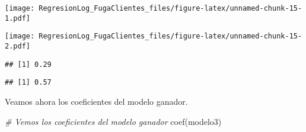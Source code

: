 \documentclass[
]{article}
\newenvironment{Shaded}{\begin{snugshade}}{\end{snugshade}}
\newcommand{\CommentTok}[1]{\textcolor[rgb]{0.56,0.35,0.01}{\textit{#1}}}
\newcommand{\DecValTok}[1]{\textcolor[rgb]{0.00,0.00,0.81}{#1}}
\newcommand{\FunctionTok}[1]{\textcolor[rgb]{0.00,0.00,0.00}{#1}}
\newcommand{\NormalTok}[1]{#1}
\newcommand{\OtherTok}[1]{\textcolor[rgb]{0.56,0.35,0.01}{#1}}
\newcommand{\SpecialCharTok}[1]{\textcolor[rgb]{0.00,0.00,0.00}{#1}}
\begin{document}
\begin{Shaded}
\end{Shaded}

\texttt{[image: RegresionLog\_FugaClientes\_files/figure-latex/unnamed-chunk-15-1.pdf]}

\begin{Shaded}
\end{Shaded}

\texttt{[image: RegresionLog\_FugaClientes\_files/figure-latex/unnamed-chunk-15-2.pdf]}

\begin{Shaded}
\end{Shaded}

\begin{verbatim}
## [1] 0.29
\end{verbatim}

\begin{Shaded}
\end{Shaded}

\begin{verbatim}
## [1] 0.57
\end{verbatim}

Veamos ahora los coeficientes del modelo ganador.

\begin{Shaded}
\begin{Highlighting}[]
\CommentTok{\# Vemos los coeficientes del modelo ganador}
\FunctionTok{coef}\NormalTok{(modelo3)}
\end{Highlighting}
\end{Shaded}
\end{document}

